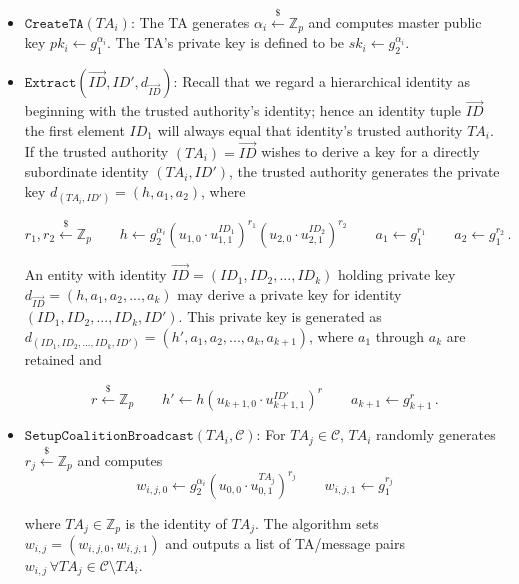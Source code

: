 \documentclass[10pt]{llncs}
\newcommand{\C}{\mathcal{C}}
\newcommand{\Zbb}{\mathbb{Z}}
\newcommand{\ID}{\mathit{ID}}
\newcommand{\TA}{\mathit{TA}}
\newcommand{\sk}{\mathit{sk}}
\newcommand{\getsr}{\stackrel{{\scriptscriptstyle\$}}{\gets}}
\begin{document}
\begin{itemize}
\item $\texttt{CreateTA}(\TA_i)$: The TA generates $\alpha_i \getsr \Zbb_{p}$ and computes master public key $pk_i \gets g_{1}^{\alpha_i}$. The TA's private key is defined to be $\sk_i \gets g_{2}^{\alpha_i}$.\medskip

\item $\texttt{Extract}(\vec{\ID},\ID',d_{\vec{\ID}})$: Recall that we regard a hierarchical identity as beginning with the trusted authority's identity; hence an identity tuple $\vec{ID}$ the first element $ID_1$ will always equal that identity's trusted authority $\TA_i$. If the trusted authority $(\TA_i) = \vec{\ID}$ wishes to derive a key for a directly subordinate identity $(\TA_i, \ID')$, the trusted authority generates the private key $d_{(\TA_i, \ID')} = (h, a_1, a_2)$, where

\begin{displaymath}
    r_{1},r_{2} \getsr \Zbb_{p} \qquad  h \gets
    g_{2}^{\alpha_{i}} (u_{1,0} \cdot u_{1,1}^{ID_{1}})^{r_{1}}
    (u_{2,0} \cdot u_{2,1}^{ID_{2}})^{r_{2}} \qquad a_{1} \gets
    g_{1}^{r_{1}} \qquad a_{2} \gets g_{1}^{r_{2}} \, .
\end{displaymath}

An entity with identity $\vec{\ID} = (\ID_1, \ID_2, ..., \ID_k)$
holding private key $d_{\vec{\ID}} = (h, a_1, a_2, ..., a_k)$
may derive a private key for identity $(\ID_1, \ID_2, ...,
\ID_k, \ID')$. This private key is generated as $d_{(\ID_1,
\ID_2, ..., \ID_k, \ID')} = (h', a_1, a_2, ..., a_k, a_{k+1})$,
where $a_1$ through $a_k$ are retained and

\begin{displaymath}
    r \getsr \Zbb_{p} \qquad  h' \gets h (u_{k+1,0} \cdot
    u_{k+1,1}^{ID'})^r \qquad a_{k+1} \gets g_{k+1}^{r} \, .
\end{displaymath}

\item $\texttt{SetupCoalitionBroadcast}(\TA_i, \C)$: For $\TA_j \in \C$, $\TA_i$ randomly generates $r_{j}\getsr \Zbb_{p}$ and computes
\begin{displaymath}
    w_{i,j,0} \gets g_{2}^{\alpha_i}(u_{0,0} \cdot
    u_{0,1}^{\TA_{j}})^{r_{j}} \qquad w_{i,j,1} \gets
    g_{1}^{r_{j}}
\end{displaymath}

where $\TA_{j} \in \Zbb_{p}$ is the identity of $\TA_{j}$. The
algorithm sets $w_{i,j}=(w_{i,j,0},w_{i,j,1})$ and outputs a
list of TA/message pairs $w_{i,j} \, \forall \TA_j \in \C
\setminus \TA_i$.\medskip


\end{itemize}
\end{document}
